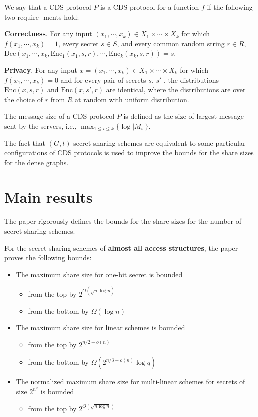 We say that a CDS protocol $P$ is a CDS protocol for a function $f$ if the following two require-
ments hold:

\textbf{Correctness}. For any input $(x_1 , \cdots , x_k ) \in X_1 \times \cdots \times X_k$ for which
$f(x_1, \cdots , x_k ) = 1$, every secret $s \in S$, and every common random string $r \in R$,
$\text{Dec}(x_1 , \cdots , x_k , \text{Enc}_1 (x_1, s, r), \cdots , \text{Enc}_k (x_k , s, r)) = s$.

\textbf{Privacy}. For any input $x = (x_1 , \cdots , x_k ) \in X_1 \times \cdots \times X_k$ for which
$f (x_1, \cdots , x_k ) = 0$ and for every pair of secrets $s$, $s'$ , the distributions $\text{Enc}(x, s, r)$
and $\text{Enc}(x, s' , r)$ are identical, where the distributions are over the choice of $r$
from $R$ at random with uniform distribution.

The message size of a CDS protocol $P$ is defined as the size of largest message
sent by the servers, i.e., $\max_{1 \le i \le k} \{\log |M_i|\}$.

The fact that $(G,t)$-secret-sharing schemes are equivalent to some particular configurations of CDS protocols is used to improve the bounds for the share sizes for the dense graphs.

\section{Main results}

The paper rigorously defines the bounds for the share sizes for the number of secret-sharing schemes.

For the secret-sharing schemes of \textbf{almost all access structures}, the paper proves the following bounds:

\begin{itemize}
    \item The maximum share size for one-bit secret is bounded 
    \begin{itemize}
        \item from the top by $2^{O(\sqrt{n}\log n)}$
        \item from the bottom by $\Omega(\log n)$
    \end{itemize}
    \item The maximum share size for linear schemes is bounded
    \begin{itemize}
        \item from the top by $2^{n/2+o(n)}$
        \item from the bottom by $\Omega(2^{n/3-o(n)}\log q)$
    \end{itemize}
    \item The normalized maximum share size for multi-linear schemes for secrets of size $2^{n^2}$ is bounded
    \begin{itemize}
        \item from the top by $2^{O(\sqrt{n \log n})}$
    \end{itemize}
\end{itemize}

